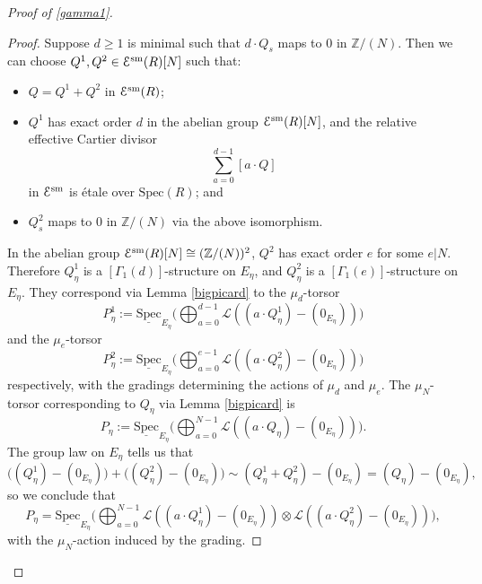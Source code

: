 \documentclass[11pt]{amsart}
\theoremstyle{definition}
\begin{document}
\begin{proof}[Proof of \ref{gamma1}]
\begin{proof}
Suppose $d\geq 1$ is minimal such that $d\cdot Q_s$ maps to $0$ in $\mathbb{Z}/(N)$. Then we can choose $Q^1,Q^2 \in {\mathbf{\EuScript{E}}}^{\mathrm{sm}}(R)[N]$ such that:
\begin{itemize}
  \item $Q = Q^1+Q^2$ in ${\mathbf{\EuScript{E}}}^{\mathrm{sm}}(R)$; 
  \item $Q^1$ has exact order $d$ in the abelian group ${\mathbf{\EuScript{E}}}^{\mathrm{sm}}(R)[N]$, and the relative effective Cartier divisor 
  \begin{displaymath}
    \sum_{a = 0}^{d-1} [a\cdot Q] 
  \end{displaymath}
  in ${\mathbf{\EuScript{E}}}^{\mathrm{sm}}$ is \'etale over $\mathrm{Spec}(R)$; and 
  \item $Q^2_s$ maps to $0$ in $\mathbb{Z}/(N)$ via the above isomorphism.
\end{itemize}
In the abelian group ${\mathbf{\EuScript{E}}}^{\mathrm{sm}}(R)[N] \cong (\mathbb{Z}/(N))^2$, $Q^2$ has exact order $e$ for some $e|N$. Therefore $Q^1_\eta$ is a $[\Gamma_1(d)]$-structure on $E_\eta$, and $Q^2_\eta$ is a $[\Gamma_1(e)]$-structure on $E_\eta$. They correspond via Lemma \ref{bigpicard} to the $\mu_d$-torsor 
\begin{displaymath}
P^1_\eta := \underline{\mathrm{Spec}}_{E_\eta} \big( \bigoplus_{a = 0}^{d-1} {\mathcal{L}}( (a\cdot Q^1_\eta)-(0_{E_\eta}))\big)
\end{displaymath}
and the $\mu_e$-torsor 
\begin{displaymath}
P^2_\eta := \underline{\mathrm{Spec}}_{E_\eta} \big( \bigoplus_{a = 0}^{e-1} {\mathcal{L}}( (a\cdot Q^2_\eta)-(0_{E_\eta}))\big)
\end{displaymath}
respectively, with the gradings determining the actions of $\mu_d$ and $\mu_e$. The $\mu_N$-torsor corresponding to $Q_\eta$ via Lemma \ref{bigpicard} is 
\begin{displaymath}
P_\eta := \underline{\mathrm{Spec}}_{E_\eta} \big( \bigoplus_{a = 0}^{N-1} {\mathcal{L}}( (a\cdot Q_\eta)-(0_{E_\eta}))\big).
\end{displaymath}
The group law on $E_\eta$ tells us that 
\begin{displaymath}
\big( (Q^1_\eta)-(0_{E_\eta})\big) + \big( (Q^2_\eta)-(0_{E_\eta}) \big) \sim (Q^1_\eta+Q^2_{\eta})-(0_{E_\eta}) = (Q_\eta)-(0_{E_\eta}),
\end{displaymath}
so we conclude that 
\begin{displaymath}
P_\eta = \underline{\mathrm{Spec}}_{E_\eta} \big( \bigoplus_{a = 0}^{N-1} {\mathcal{L}}( (a\cdot Q^1_\eta)-(0_{E_\eta})) \otimes {\mathcal{L}}( (a\cdot Q^2_\eta)-(0_{E_\eta})) \big),
\end{displaymath}
with the $\mu_N$-action induced by the grading.


\end{proof}
\end{proof}
\end{document}
